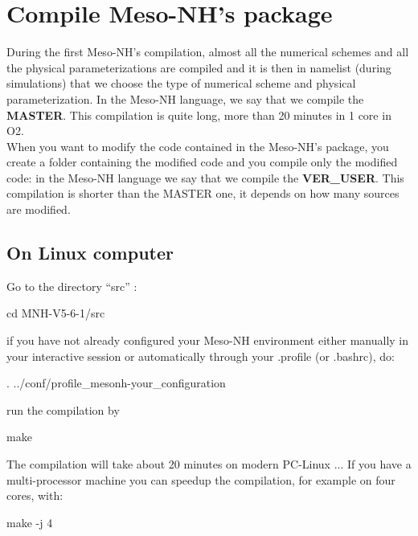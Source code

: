 \section{Compile Meso-NH's package}
\label{sec:compile_mesonh_package}

During the first Meso-NH's compilation, almost all the numerical schemes and all the physical parameterizations are compiled and it is then in namelist (during simulations) that we choose the type of numerical scheme and physical parameterization. In the Meso-NH language, we say that we compile the \textbf{MASTER}. This compilation is quite long, more than 20 minutes in 1 core in O2. \\

When you want to modify the code contained in the Meso-NH's package, you create a folder containing the modified code and you compile only the modified code: in the Meso-NH language we say that we compile the \textbf{VER\_USER}. This compilation is shorter than the MASTER one, it depends on how many sources are modified.

\subsection{On Linux computer}

Go to the directory ``src'' :
\begin{bashcode}
cd  MNH-V5-6-1/src
\end{bashcode}

if you have not already configured your Meso-NH environment either manually in your interactive session or automatically through your .profile (or .bashrc), do:
\begin{bashcode}
. ../conf/profile_mesonh-your_configuration
\end{bashcode}

run the compilation by
\begin{bashcode}
make
\end{bashcode}

The compilation will take about 20 minutes on modern PC-Linux ... If you have a multi-processor machine you can speedup the compilation, for example on four cores, with:
\begin{bashcode}
make -j 4
\end{bashcode}

